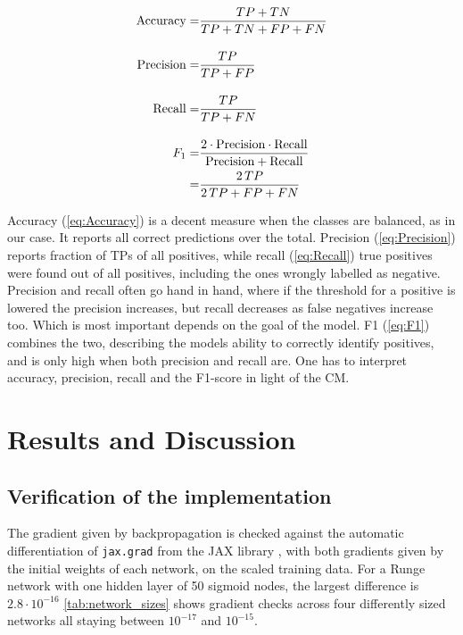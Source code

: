 \documentclass[reprint,english,notitlepage, floatfix]{revtex4-2}  %
\begin{document}
\begin{align}
    \text{Accuracy} =& \frac{TP + TN}{TP + TN + FP + FN} \label{eq:Accuracy}\\[1em]
    \text{Precision} =& \frac{TP}{TP + FP} \label{eq:Precision}\\[1em]
    \text{Recall} =& \frac{TP}{TP + FN} \label{eq:Recall}\\[1em]
    F_1 =& \frac{2 \cdot \text{Precision} \cdot \text{Recall}}{\text{Precision} + \text{Recall}}  \notag \\ 
    =&\frac{2\,TP}{2\,TP + FP + FN} \label{eq:F1}
\end{align}

Accuracy (\cref{eq:Accuracy}) is a decent measure when the classes are balanced, as in our case. It reports all correct predictions over the total. Precision (\cref{eq:Precision}) reports fraction of TPs of all positives, while recall (\cref{eq:Recall}) true positives were found out of all positives, including the ones wrongly labelled as negative. Precision and recall often go hand in hand, where if the threshold for a positive is lowered the precision increases, but recall decreases as false negatives increase too. Which is most important depends on the goal of the model. F1 (\cref{eq:F1}) combines the two, describing the models ability to correctly identify positives, and is only high when both precision and recall are. One has to interpret accuracy, precision, recall and the F1-score in light of the CM\cite{lecture_book}. 


\section{Results and Discussion}\label{sec: Results and Discussion}

\subsection{Verification of the implementation}\label{sec:res_verification}

The gradient given by backpropagation is checked against the automatic differentiation of \texttt{jax.grad} from the JAX library \cite{jax}, with both gradients given by the initial weights of each network, on the scaled training data. For a Runge network with one hidden layer of 50 sigmoid nodes, the largest difference is $ 2.8 \cdot 10 ^ {-16}$
\autoref{tab:network_sizes} shows gradient checks across four differently sized networks all staying between $10^{-17}$ and $10^{-15}$.
\end{document}
